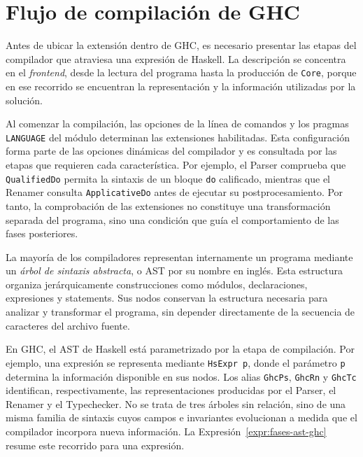 
\section{Flujo de compilación de GHC}
\label{sec:solucion-pipeline-ghc}

Antes de ubicar la extensión dentro de \textsf{GHC}, es necesario presentar las etapas del compilador que atraviesa una expresión de \textsf{Haskell}. La descripción se concentra en el \textit{frontend}, desde la lectura del programa hasta la producción de \texttt{Core}, porque en ese recorrido se encuentran la representación y la información utilizadas por la solución.

Al comenzar la compilación, las opciones de la línea de comandos y los pragmas \texttt{LANGUAGE} del módulo determinan las extensiones habilitadas. Esta configuración forma parte de las opciones dinámicas del compilador y es consultada por las etapas que requieren cada característica. Por ejemplo, el Parser comprueba que \texttt{QualifiedDo} permita la sintaxis de un bloque \texttt{do} calificado, mientras que el Renamer consulta \texttt{ApplicativeDo} antes de ejecutar su postprocesamiento. Por tanto, la comprobación de las extensiones no constituye una transformación separada del programa, sino una condición que guía el comportamiento de las fases posteriores.

La mayoría de los compiladores representan internamente un programa mediante un \textit{árbol de sintaxis abstracta}, o AST por su nombre en inglés. Esta estructura organiza jerárquicamente construcciones como módulos, declaraciones, expresiones y statements. Sus nodos conservan la estructura necesaria para analizar y transformar el programa, sin depender directamente de la secuencia de caracteres del archivo fuente.

En \textsf{GHC}, el AST de \textsf{Haskell} está parametrizado por la etapa de compilación. Por ejemplo, una expresión se representa mediante \texttt{HsExpr p}, donde el parámetro \texttt{p} determina la información disponible en sus nodos. Los alias \texttt{GhcPs}, \texttt{GhcRn} y \texttt{GhcTc} identifican, respectivamente, las representaciones producidas por el Parser, el Renamer y el Typechecker. No se trata de tres árboles sin relación, sino de una misma familia de sintaxis cuyos campos e invariantes evolucionan a medida que el compilador incorpora nueva información. La Expresión~\ref{expr:fases-ast-ghc} resume este recorrido para una expresión.

